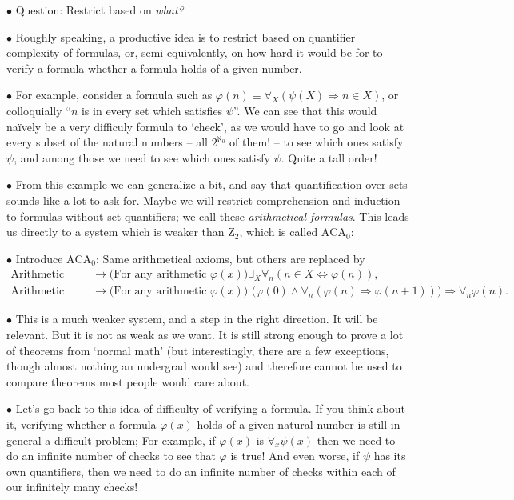 \documentclass{article}
\theoremstyle{nonumberplain}
\newcommand{\ACA}{\mathrm{ACA}}
\newcommand{\ZZ}{\mathrm{Z}}
\newcommand\point[1]{\noindent \hspace{\labelsep} $\bullet$ #1 \smallskip}
\begin{document}
\point{Question: Restrict based on \emph{what?}}

\point{Roughly speaking, a productive idea is to restrict based on quantifier complexity of formulas, or, semi-equivalently, on how hard it would be for to verify a formula whether a formula holds of a given number.}

\point{For example, consider a formula such as $\varphi(n) \equiv \forall_X (\psi(X) \Rightarrow n \in X)$, or colloquially ``$n$ is in every set which satisfies $\psi$''. We can see that this would naïvely be a very difficuly formula to `check', as we would  have to go and look at every subset of the natural numbers -- all $2^{\aleph_0}$ of them! -- to see which ones satisfy $\psi$, and among those we need to see which ones satisfy $\psi$. Quite a tall order!}

\point{From this example we can generalize a bit, and say that quantification over sets sounds like a lot to ask for. Maybe we will restrict comprehension and induction to formulas without set quantifiers; we call these \emph{arithmetical formulas}. This leads us directly to a system which is weaker than $\ZZ_2$, which is called $\ACA_0$:}

\point{Introduce $\ACA_0$: Same arithmetical axioms, but others are replaced by}
\begin{equation}
\begin{aligned}
\text{Arithmetic comprehension} &\rightarrow \text{(For any arithmetic $\varphi(x)$)} \exists_X \forall_n (n \in X \Leftrightarrow \varphi(n)),\\
\text{Arithmetic induction} &\rightarrow \text{(For any arithmetic $\varphi(x)$) } \big(\varphi(0) \land \forall_n (\varphi(n) \Rightarrow \varphi(n+1)) \big) \Rightarrow \forall_n \varphi(n).
\end{aligned}
\end{equation}

\point{This is a much weaker system, and a step in the right direction. It will be relevant. But it is not as weak as we want. It is still strong enough to prove a lot of theorems from `normal math' (but interestingly, there are a few exceptions, though almost nothing an undergrad would see) and therefore cannot be used to compare theorems most people would care about.}

\point{Let's go back to this idea of difficulty of verifying a formula. If you think about it, verifying whether a formula $\varphi(x)$ holds of a given natural number is still in general a difficult problem; For example, if $\varphi(x)$ is $\forall_x \psi(x)$ then we need to do an infinite number of checks to see that $\varphi$ is true! And even worse, if $\psi$ has its own quantifiers, then we need to do an infinite number of checks within each of our infinitely many checks!}
\end{document}
